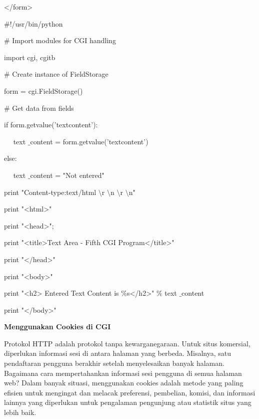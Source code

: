 \begin {enumerate}
\begin {enumerate}
\noindent
</form> \par
\vspace{12pt}
\noindent
 $  \#  $!/usr/bin/python \par
\vspace{12pt}
\noindent
 $  \#  $ Import modules for CGI handling  \par
\noindent
import cgi, cgitb  \par
\vspace{12pt}
\noindent
 $  \#  $ Create instance of FieldStorage  \par
\noindent
form = cgi.FieldStorage()  \par
\vspace{12pt}
\noindent
 $  \#  $ Get data from fields \par
\noindent
if form.getvalue('textcontent'): \par
\noindent
~~ text $  \_  $content = form.getvalue('textcontent') \par
\noindent
else: \par
\noindent
~~ text $  \_  $content = "Not entered" \par
\vspace{12pt}
\noindent
print "Content-type:text/html $  \setminus  $r $  \setminus  $n $  \setminus  $r $  \setminus  $n" \par
\noindent
print "<html>" \par
\noindent
print "<head>"; \par
\noindent
print "<title>Text Area - Fifth CGI Program</title>" \par
\noindent
print "</head>" \par
\noindent
print "<body>" \par
\noindent
print "<h2> Entered Text Content is  $  \%  $s</h2>"  $  \%  $ text $  \_  $content \par
\noindent
print "</body>" \par
\vspace{12pt}
\noindent
{\fontsize{14pt}{14pt}\selectfont \textbf{Menggunakan Cookies di CGI} \\} \par
\noindent
Protokol HTTP adalah protokol tanpa kewarganegaraan. Untuk situs komersial, diperlukan informasi sesi di antara halaman yang berbeda. Misalnya, satu pendaftaran pengguna berakhir setelah menyelesaikan banyak halaman. Bagaimana cara mempertahankan informasi sesi pengguna di semua halaman web? Dalam banyak situasi, menggunakan cookies adalah metode yang paling efisien untuk mengingat dan melacak preferensi, pembelian, komisi, dan informasi lainnya yang diperlukan untuk pengalaman pengunjung atau statistik situs yang lebih baik. \par

\end{enumerate}
\end{enumerate}
